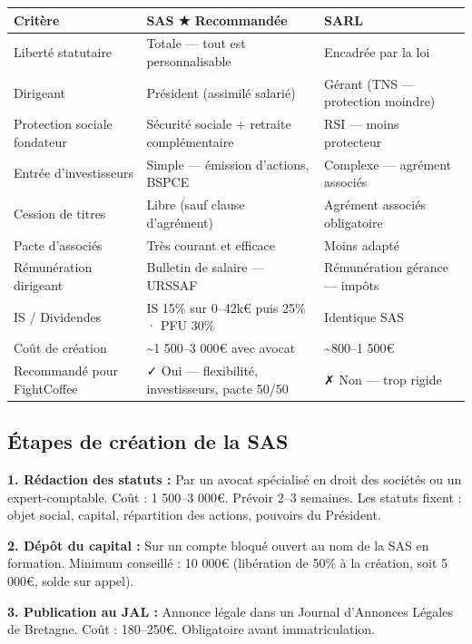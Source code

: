 \documentclass[11pt, a4paper]{article}
\newcommand{\negnum}[1]{\textcolor{fc-red}{#1}}
\newcommand{\posnum}[1]{\textcolor{green!60!black}{#1}}
\begin{document}
\begin{center}
\begin{tabular}{@{}p{4cm}p{5cm}p{4cm}@{}}
\toprule
\rowcolor{fc-ink}\color{white}\textbf{Critère} & \color{white}\textbf{SAS ★ Recommandée} & \color{white}\textbf{SARL} \\
\midrule
Liberté statutaire & Totale — tout est personnalisable & Encadrée par la loi \\
\rowcolor{fc-bg2} Dirigeant & Président (assimilé salarié) & Gérant (TNS — protection moindre) \\
Protection sociale fondateur & Sécurité sociale + retraite complémentaire & RSI — moins protecteur \\
\rowcolor{fc-bg2} Entrée d'investisseurs & Simple — émission d'actions, BSPCE & Complexe — agrément associés \\
Cession de titres & Libre (sauf clause d'agrément) & Agrément associés obligatoire \\
\rowcolor{fc-bg2} Pacte d'associés & Très courant et efficace & Moins adapté \\
Rémunération dirigeant & Bulletin de salaire — URSSAF & Rémunération gérance — impôts \\
\rowcolor{fc-bg2} IS / Dividendes & IS 15\% sur 0–42k€ puis 25\% · PFU 30\% & Identique SAS \\
Coût de création & \textasciitilde1 500–3 000€ avec avocat & \textasciitilde800–1 500€ \\
\rowcolor{fc-bg2} Recommandé pour FightCoffee & \posnum{✓ Oui — flexibilité, investisseurs, pacte 50/50} & \negnum{✗ Non — trop rigide} \\
\bottomrule
\end{tabular}
\end{center}

\subsection{Étapes de création de la SAS}

\textbf{1. Rédaction des statuts :} Par un avocat spécialisé en droit des sociétés ou un expert-comptable. Coût : 1 500–3 000€. Prévoir 2–3 semaines. Les statuts fixent : objet social, capital, répartition des actions, pouvoirs du Président.

\textbf{2. Dépôt du capital :} Sur un compte bloqué ouvert au nom de la SAS en formation. Minimum conseillé : 10 000€ (libération de 50\% à la création, soit 5 000€, solde sur appel).

\textbf{3. Publication au JAL :} Annonce légale dans un Journal d'Annonces Légales de Bretagne. Coût : 180–250€. Obligatoire avant immatriculation.
\end{document}

